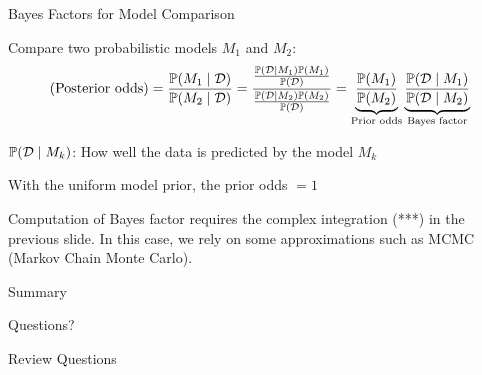 \documentclass[handout,fleqn,aspectratio=169]{beamer}
\begin{document}
\begin{frame}{Bayes Factors for Model Comparison}

\plitemsep 0.1in

\bci 

\item Compare two probabilistic models $M_1$ and $M_2$:
$$
\text{(Posterior odds)} = \frac{\mathbb{P}( M_1 \mid \mathcal D )}{\mathbb{P}( M_2 \mid \mathcal D )} = \frac
{
\frac{\mathbb{P}( \mathcal D \mid M_1 )\mathbb{P}( M_1 )}{\mathbb{P}( \mathcal D )}
}
{
\frac{\mathbb{P}( \mathcal D \mid M_2 )\mathbb{P}( M_2 )}{\mathbb{P}( \mathcal D )}
}
= \underbrace{\frac{\mathbb{P}( M_1 )}{\mathbb{P}( M_2 )}}_{\text{Prior odds}} 
\underbrace{\frac{\mathbb{P}( \mathcal D \mid M_1 )}{\mathbb{P}( \mathcal D \mid M_2 )}}_{\text{Bayes factor}}
$$
\item $\mathbb{P}( \mathcal D \mid M_k )$: How well the data is predicted by the model $M_k$
\item With the uniform model prior, the prior odds $= 1$

\item Computation of Bayes factor requires the complex integration (***) in the previous slide. In this case, we rely on some approximations such as MCMC (Markov Chain Monte Carlo). 
\eci

\end{frame}


\begin{frame}{Summary}

\plitemsep 0.1in

\bci 

\item 
\eci
\end{frame}



\begin{frame}{}
\vspace{2cm}
\LARGE Questions?


\end{frame}

\begin{frame}{Review Questions}
\bce[1)]
\item 

\ece
\end{frame}
\end{document}
